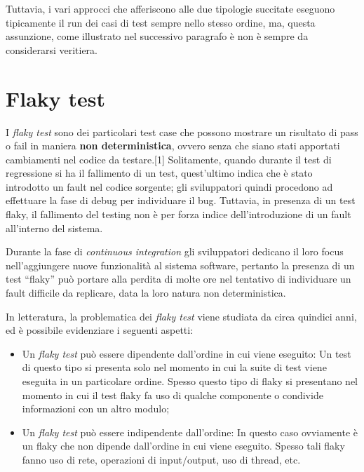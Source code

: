 Tuttavia, i vari approcci che afferiscono alle due tipologie succitate eseguono tipicamente il run dei casi di test sempre nello stesso ordine, ma, questa assunzione, come illustrato nel successivo paragrafo è non è sempre da considerarsi veritiera.
\section{Flaky test}
I \emph{flaky test} sono dei particolari test case che possono mostrare un risultato di pass o fail in maniera \textbf{non deterministica}, ovvero senza che siano stati apportati cambiamenti nel codice da testare.[1] Solitamente, quando durante il test di regressione si ha il fallimento di un test, quest’ultimo indica che è stato introdotto
un fault nel codice sorgente; gli sviluppatori quindi procedono ad effettuare la fase
di debug per individuare il bug. Tuttavia, in presenza di un test flaky, il fallimento del testing non è per forza indice dell’introduzione di un fault all’interno del
sistema.

Durante la fase di \emph{continuous integration} gli sviluppatori dedicano il loro focus nell’aggiungere nuove funzionalità al sistema software, pertanto la presenza
di un test “flaky” può portare alla perdita di molte ore nel tentativo di individuare
un fault difficile da replicare, data la loro natura non deterministica.

In letteratura, la problematica dei \emph{flaky test} viene studiata da circa quindici anni, ed è possibile evidenziare i seguenti aspetti:
\begin{itemize}
	\item Un \emph{flaky test} può essere dipendente dall’ordine in cui viene eseguito: Un test di questo tipo si presenta solo nel momento in cui la suite di test viene eseguita in un particolare ordine. Spesso questo tipo di flaky si presentano nel momento in cui il test flaky fa uso di qualche componente o condivide informazioni con un altro modulo;
	\item Un \emph{flaky test} può essere indipendente dall’ordine: In questo caso ovviamente è un flaky che non dipende dall’ordine in cui viene eseguito. Spesso tali flaky fanno uso di rete, operazioni di input/output, uso di thread, etc.
\end{itemize}

